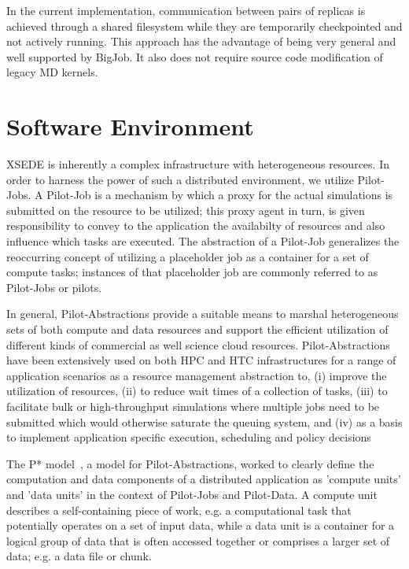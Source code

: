 \documentclass{sig-alternate}
\begin{document}
In the current implementation, communication between pairs of replicas
is achieved through a shared filesystem while they are temporarily
checkpointed and not actively running. This approach has the advantage
of being very general and well supported by BigJob. It also does not
require source code modification of legacy MD kernels.

\section{Software Environment}

XSEDE is inherently a complex infrastructure with heterogeneous
resources. In order to harness the power of such a distributed
environment, we utilize Pilot-Jobs. A Pilot-Job is a mechanism by 
which a proxy for the actual simulations
is submitted on the resource to be utilized; this proxy agent in turn,
is given responsibility to convey to the application the availabilty
of resources and also influence which tasks are executed. The
abstraction of a Pilot-Job generalizes the reoccurring concept of
utilizing a placeholder job as a container for a set of compute tasks;
instances of that placeholder job are commonly referred to as
Pilot-Jobs or pilots. 

In general, Pilot-Abstractions provide a suitable means to marshal
heterogeneous sets of both compute and data resources and support the
efficient utilization of different kinds of commercial as well science
cloud resources. Pilot-Abstractions have been extensively used on both
HPC and HTC infrastructures for a range of application scenarios as a
resource management abstraction to, (i) improve the utilization of
resources, (ii) to reduce wait times of a collection of tasks, (iii)
to facilitate bulk or high-throughput simulations where multiple jobs
need to be submitted which would otherwise saturate the queuing
system, and (iv) as a basis to implement application specific
execution, scheduling and policy decisions

The P* model~\cite{pstar12}, a model for Pilot-Abstractions, worked to
clearly define the computation and data components of a distributed
application as 'compute units' and 'data units' in the context of
Pilot-Jobs and Pilot-Data. A compute unit describes a self-containing
piece of work, e.g. a computational task that potentially operates on
a set of input data, while a data unit is a container for a logical
group of data that is often accessed together or comprises a larger
set of data; e.g. a data file or chunk.
\end{document}
